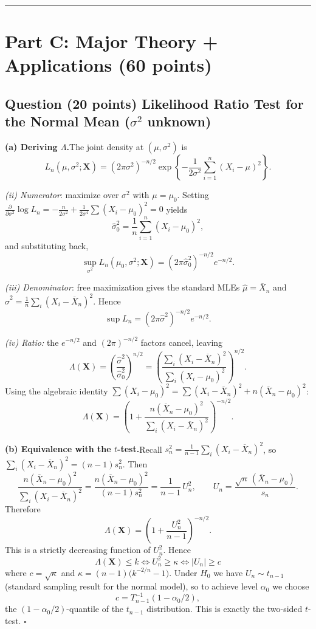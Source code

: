 \documentclass[11pt]{article}
\newcounter{qnum}
\newcommand{\question}[2]{\stepcounter{qnum}\subsection*{Question \theqnum \quad (#1 points) \hfill #2}}
\newcommand{\bX}{\mathbf{X}}
\begin{document}
\bigskip
\hrule
\bigskip

\section*{Part C: Major Theory + Applications \hfill (60 points)}

\question{20}{Likelihood Ratio Test for the Normal Mean ($\sigma^2$ unknown)}

\textbf{(a) Deriving $\Lambda$.}\quad The joint density at $(\mu,\sigma^2)$ is
\[
L_n(\mu,\sigma^2;\bX) = (2\pi\sigma^2)^{-n/2} \exp\!\left\{-\frac{1}{2\sigma^2}\sum_{i=1}^n (X_i - \mu)^2\right\}.
\]

\emph{(ii) Numerator}: maximize over $\sigma^2$ with $\mu = \mu_0$. Setting $\frac{\partial}{\partial \sigma^2}\log L_n = -\frac{n}{2\sigma^2} + \frac{1}{2\sigma^4}\sum (X_i-\mu_0)^2 = 0$ yields
\[
\hat\sigma_0^2 = \frac{1}{n}\sum_{i=1}^n (X_i - \mu_0)^2,
\]
and substituting back,
\[
\sup_{\sigma^2} L_n(\mu_0,\sigma^2;\bX) = (2\pi\hat\sigma_0^2)^{-n/2} e^{-n/2}.
\]

\emph{(iii) Denominator}: free maximization gives the standard MLEs $\hat\mu = \overline{X}_n$ and $\hat\sigma^2 = \frac{1}{n}\sum_i (X_i-\overline{X}_n)^2$. Hence
\[
\sup L_n = (2\pi\hat\sigma^2)^{-n/2} e^{-n/2}.
\]

\emph{(iv) Ratio:} the $e^{-n/2}$ and $(2\pi)^{-n/2}$ factors cancel, leaving
\[
\Lambda(\bX) = \left(\frac{\hat\sigma^2}{\hat\sigma_0^2}\right)^{n/2}
= \left(\frac{\sum_i (X_i - \overline{X}_n)^2}{\sum_i (X_i - \mu_0)^2}\right)^{n/2}.
\]
Using the algebraic identity $\sum (X_i-\mu_0)^2 = \sum (X_i-\overline{X}_n)^2 + n(\overline{X}_n-\mu_0)^2$:
\[
\boxed{\;\Lambda(\bX) = \left(1 + \frac{n(\overline{X}_n - \mu_0)^2}{\sum_i (X_i - \overline{X}_n)^2}\right)^{-n/2}.\;}
\]

\medskip

\textbf{(b) Equivalence with the $t$-test.}\quad Recall $s_n^2 = \frac{1}{n-1}\sum_i (X_i - \overline{X}_n)^2$, so $\sum_i (X_i-\overline{X}_n)^2 = (n-1)s_n^2$. Then
\[
\frac{n(\overline{X}_n - \mu_0)^2}{\sum_i (X_i - \overline{X}_n)^2}
= \frac{n(\overline{X}_n - \mu_0)^2}{(n-1)s_n^2}
= \frac{1}{n-1}\,U_n^2,\qquad U_n = \frac{\sqrt{n}\,(\overline{X}_n - \mu_0)}{s_n}.
\]
Therefore
\[
\Lambda(\bX) = \left(1 + \frac{U_n^2}{n-1}\right)^{-n/2}.
\]
This is a strictly decreasing function of $U_n^2$. Hence
\[
\Lambda(\bX) \le k \iff U_n^2 \ge \kappa \iff |U_n| \ge c
\]
where $c = \sqrt{\kappa}$ and $\kappa = (n-1)\bigl(k^{-2/n} - 1\bigr)$. Under $H_0$ we have $U_n \sim t_{n-1}$ (standard sampling result for the normal model), so to achieve level $\alpha_0$ we choose
\[
c = T_{n-1}^{-1}(1 - \alpha_0/2),
\]
the $(1-\alpha_0/2)$-quantile of the $t_{n-1}$ distribution. This is exactly the two-sided $t$-test. \hfill$\square$
\end{document}
